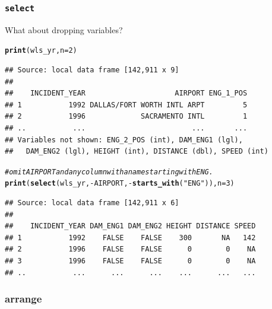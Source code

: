 \documentclass{beamer}\usepackage[]{graphicx}\usepackage[]{color}
\makeatletter
\newcommand{\hlnum}[1]{\textcolor[rgb]{0.686,0.059,0.569}{#1}}%
\newcommand{\hlstr}[1]{\textcolor[rgb]{0.192,0.494,0.8}{#1}}%
\newcommand{\hlcom}[1]{\textcolor[rgb]{0.678,0.584,0.686}{\textit{#1}}}%
\newcommand{\hlopt}[1]{\textcolor[rgb]{0,0,0}{#1}}%
\newcommand{\hlstd}[1]{\textcolor[rgb]{0.345,0.345,0.345}{#1}}%
\newcommand{\hlkwc}[1]{\textcolor[rgb]{0.333,0.667,0.333}{#1}}%
\newcommand{\hlkwd}[1]{\textcolor[rgb]{0.737,0.353,0.396}{\textbf{#1}}}%
\newenvironment{kframe}{%
 \def\at@end@of@kframe{}%
 \ifinner\ifhmode%
  \def\at@end@of@kframe{\end{minipage}}%
  \begin{minipage}{\columnwidth}%
 \fi\fi%
 \def\FrameCommand##1{\hskip\@totalleftmargin \hskip-\fboxsep
 \colorbox{shadecolor}{##1}\hskip-\fboxsep
     \hskip-\linewidth \hskip-\@totalleftmargin \hskip\columnwidth}%
 \MakeFramed {\advance\hsize-\width
   \@totalleftmargin\z@ \linewidth\hsize
   \@setminipage}}%
 {\par\unskip\endMakeFramed%
 \at@end@of@kframe}
\newenvironment{knitrout}{}{} %
\makeatother
\begin{document}
\begin{frame}[fragile]
  \frametitle{{\tt select}}
  What about dropping variables?
\begin{knitrout}\footnotesize
{}\color{fgcolor}\begin{kframe}
\begin{alltt}
\hlkwd{print}\hlstd{(wls_yr,} \hlkwc{n} \hlstd{=} \hlnum{2}\hlstd{)}
\end{alltt}
\begin{verbatim}
## Source: local data frame [142,911 x 9]
## 
##    INCIDENT_YEAR                     AIRPORT ENG_1_POS
## 1           1992 DALLAS/FORT WORTH INTL ARPT         5
## 2           1996             SACRAMENTO INTL         1
## ..           ...                         ...       ...
## Variables not shown: ENG_2_POS (int), DAM_ENG1 (lgl),
##   DAM_ENG2 (lgl), HEIGHT (int), DISTANCE (dbl), SPEED (int)
\end{verbatim}
\begin{alltt}
\hlcom{# omit AIRPORT and any column with a name starting with ENG.}
\hlkwd{print}\hlstd{(}\hlkwd{select}\hlstd{(wls_yr,} \hlopt{-}\hlstd{AIRPORT,} \hlopt{-}\hlkwd{starts_with}\hlstd{(}\hlstr{"ENG"}\hlstd{)),} \hlkwc{n} \hlstd{=} \hlnum{3}\hlstd{)}
\end{alltt}
\begin{verbatim}
## Source: local data frame [142,911 x 6]
## 
##    INCIDENT_YEAR DAM_ENG1 DAM_ENG2 HEIGHT DISTANCE SPEED
## 1           1992    FALSE    FALSE    300       NA   142
## 2           1996    FALSE    FALSE      0        0    NA
## 3           1996    FALSE    FALSE      0        0    NA
## ..           ...      ...      ...    ...      ...   ...
\end{verbatim}
\end{kframe}
\end{knitrout}
\end{frame} 

\subsubsection{arrange}%
\end{document}
